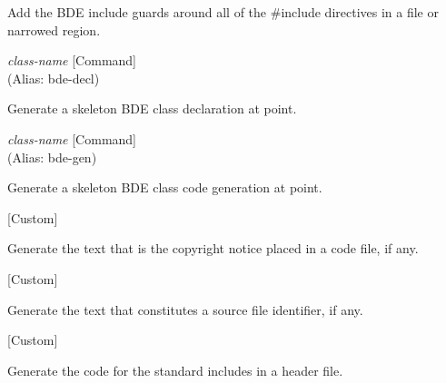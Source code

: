 \begin{doc-string}
Add the BDE include guards around all of the \#include directives in a file
or narrowed region.
\end{doc-string}

\vspace{1em}
\noindent
{}
\usebox{\funcname}\emph{class-name}
 \hfill [Command]\\%
 (Alias: bde-decl)

\begin{doc-string}
Generate a skeleton BDE class declaration at point.
\end{doc-string}

\vspace{1em}
\noindent
{}
\usebox{\funcname}\emph{class-name}
 \hfill [Command]\\%
 (Alias: bde-gen)

\begin{doc-string}
Generate a skeleton BDE class code generation at point.
\end{doc-string}

\vspace{1em}
\noindent
{}
\usebox{\funcname}
 \hfill [Custom]

\begin{doc-string}
Generate the text that is the copyright notice placed in a code file,
if any.
\end{doc-string}

\vspace{1em}
\noindent
{}
\usebox{\funcname}
 \hfill [Custom]

\begin{doc-string}
Generate the text that constitutes a source file identifier, if any.
\end{doc-string}

\vspace{1em}
\noindent
{}
\usebox{\funcname}
 \hfill [Custom]

\begin{doc-string}
Generate the code for the standard includes in a header file.
\end{doc-string}

